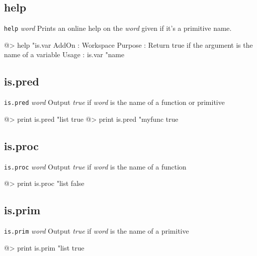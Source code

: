 \subsection*{help}  
 
{\tt help} {\it word} 
\newline\newline
Prints an online help on the {\it word} given if it's a primitive name.
\begin{verbatimtab} 
@> help "is.var
AddOn   :	Workspace
Purpose :	Return true if the argument is the name of a variable
Usage   :	is.var "name
\end{verbatimtab}

\subsection*{is.pred}  
 
{\tt is.pred} {\it word} 
\newline\newline
Output {\it true} if {\it word} is the name of a function or primitive
\begin{verbatimtab} 
@> print is.pred "list
true
@> print is.pred "myfunc
true
\end{verbatimtab}

\subsection*{is.proc}  
 
{\tt is.proc} {\it word} 
\newline\newline
Output {\it true} if {\it word} is the name of a function
\begin{verbatimtab} 
@> print is.proc "list
false
\end{verbatimtab}

\subsection*{is.prim}  
 
{\tt is.prim} {\it word} 
\newline\newline
Output {\it true} if {\it word} is the name of a primitive
\begin{verbatimtab} 
@> print is.prim "list
true
\end{verbatimtab}

